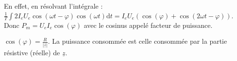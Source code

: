 \documentclass[french]{yLectureNote}
\newcommand{\dd}{\mathrm{d}}
\begin{document}
En effet, en résolvant l'intégrale : \(\frac{1}{T}\int 2I_eU_e \cos(\omega t-\varphi)\cos(\omega t)\dd t = I_eU_e(\cos(\varphi)+ \cos(2\omega t-\varphi))\). Donc \(P_m = U_eI_e \cos(\varphi)\) avec le cosinus appelé facteur de puissance.


\(\cos(\varphi) = \frac{R}{|\underline{z}|}\). La puissance consommée est celle consommée par la partie résistive (réelle) de \(\underline{z}\).

%
%
%
%
%
\end{document}
